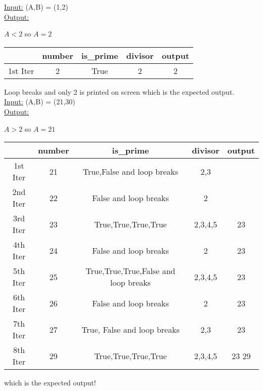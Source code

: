 \documentclass[a4paper]{exam}
\begin{document}
\begin{questions}
  \underline{Input:} (A,B) = (1,2) \\
  \underline{Output:}

  $A < 2$ so $A = 2$
  
    \begin{tabular}{|c|c|c|c|c|}
        \hline
        \textbf{}  & \textbf{number} & \textbf{is\_prime} & \textbf{divisor} & \textbf{output} \\
        \hline
        1st Iter & 2 & True & 2 & 2 \\
        \hline
        \hline
    \end{tabular}

    Loop breaks and only 2 is printed on screen which is the expected output. \\

    \underline{Input:} (A,B) = (21,30) \\
  \underline{Output:}

  $A > 2$ so $A = 21$
  
    \begin{tabular}{|c|c|c|c|c|}
        \hline
        \textbf{}  & \textbf{number} & \textbf{is\_prime} & \textbf{divisor} & \textbf{output} \\
        \hline
        1st Iter & 21 & True,False and loop breaks & 2,3 & \\
        \hline
        2nd Iter & 22 & False and loop breaks & 2 &  \\
        \hline
        3rd Iter & 23& True,True,True,True & 2,3,4,5 & 23 \\
        \hline
        4th Iter & 24 & False and loop breaks & 2 & 23\\
        \hline
        5th Iter & 25 & True,True,True,False and loop breaks  & 2,3,4,5 & 23\\
        \hline
        6th Iter & 26 & False and loop breaks  & 2 & 23\\
        \hline
        7th Iter & 27 & True, False and loop breaks  & 2,3 & 23\\
        \hline
        8th Iter & 29& True,True,True,True & 2,3,4,5 & 23 29\\
        \hline
    \end{tabular}

which is the expected output! 


\end{questions}
\end{document}
